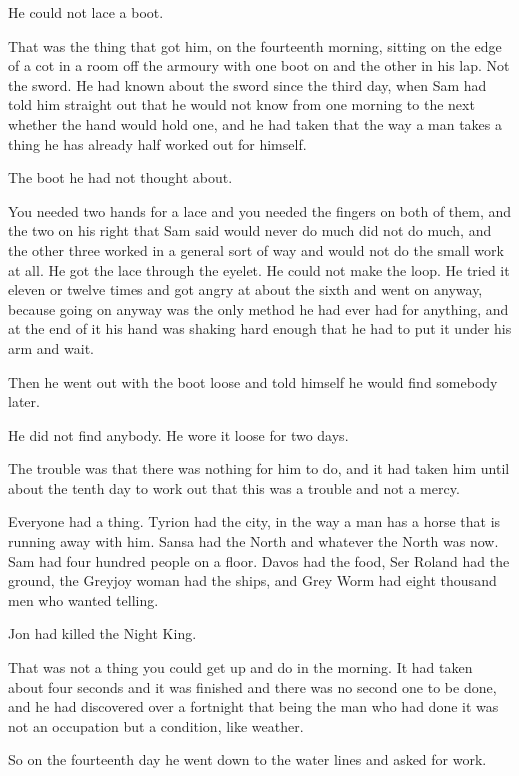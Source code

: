 He could not lace a boot.

That was the thing that got him, on the fourteenth morning, sitting on the edge of a cot in a room off the armoury with one boot on and the other in his lap. Not the sword. He had known about the sword since the third day, when Sam had told him straight out that he would not know from one morning to the next whether the hand would hold one, and he had taken that the way a man takes a thing he has already half worked out for himself.

The boot he had not thought about.

You needed two hands for a lace and you needed the fingers on both of them, and the two on his right that Sam said would never do much did not do much, and the other three worked in a general sort of way and would not do the small work at all. He got the lace through the eyelet. He could not make the loop. He tried it eleven or twelve times and got angry at about the sixth and went on anyway, because going on anyway was the only method he had ever had for anything, and at the end of it his hand was shaking hard enough that he had to put it under his arm and wait.

Then he went out with the boot loose and told himself he would find somebody later.

He did not find anybody. He wore it loose for two days.

\sceneBreak

The trouble was that there was nothing for him to do, and it had taken him until about the tenth day to work out that this was a trouble and not a mercy.

Everyone had a thing. Tyrion had the city, in the way a man has a horse that is running away with him. Sansa had the North and whatever the North was now. Sam had four hundred people on a floor. Davos had the food, Ser Roland had the ground, the Greyjoy woman had the ships, and Grey Worm had eight thousand men who wanted telling.

Jon had killed the Night King.

That was not a thing you could get up and do in the morning. It had taken about four seconds and it was finished and there was no second one to be done, and he had discovered over a fortnight that being the man who had done it was not an occupation but a condition, like weather.

So on the fourteenth day he went down to the water lines and asked for work.

\sceneBreak

